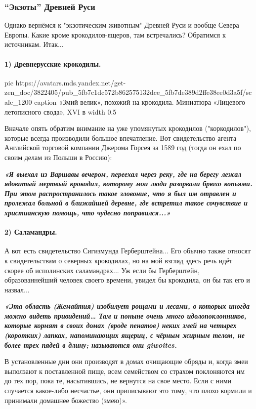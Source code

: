 \subsubsection{\enquote{Экзоты} Древней Руси}

Однако вернёмся к "экзотическим животным" Древней Руси и вообще Севера Европы.
Какие кроме крокодилов-ящеров, там встречались? Обратимся к источникам. Итак...

\paragraph{1) Древнерусские крокодилы.}

\ifcmt
  pic https://avatars.mds.yandex.net/get-zen_doc/3822405/pub_5fb7c1dc572b862575132dce_5fb7de389d2ffe38ee0d3a5f/scale_1200
	caption «Змий велик», похожий на крокодила. Миниатюра «Лицевого летописного свода», XVI в
	width 0.5
\fi

Вначале опять обратим внимание на уже упомянутых крокодилов ("коркодилов"),
которые всегда производили большое впечатление. Вот свидетельство агента
Английской торговой компании Джерома Горсея за 1589 год (тогда он ехал по своим
делам из Польши в Россию): 

\begin{leftbar}
  \begingroup
    \em\large\bfseries\color{blue}
«Я выехал из Варшавы вечером, переехал через реку, где на берегу лежал ядовитый
мертвый крокодил, которому мои люди разорвали брюхо копьями. При этом
распространилось такое зловоние, что я был им отравлен и пролежал больной в
ближайшей деревне, где встретил такое сочувствие и христианскую помощь, что
чудесно поправился...»
  \endgroup
\end{leftbar}

\paragraph{2) Саламандры.}

А вот есть свидетельство Сигизмунда Герберштейна... Его обычно также относят к
свидетельствам о северных крокодилах, но на мой взгляд здесь речь идёт скорее
об исполинских саламандрах... Уж если бы Герберштейн, образованнейший человек
своего времени, увидел бы крокодила, он бы так его и назвал...

\begin{leftbar}
  \begingroup
    \em\large\bfseries\color{blue}
				«Эта область (Жемайтия) изобилует рощами и лесами, в которых иногда
				можно видеть привидений… Там и поныне очень много идолопоклонников,
				которые кормят в своих домах (вроде пенатов) неких змей на четырех
				(коротких) лапках, напоминающих ящериц, с чёрным жирным телом, не более
				трех пядей в длину; называются они giwoites.

		В установленные дни они производят в домах очищающие обряды и, когда змеи
				выползают к поставленной пище, всем семейством со страхом поклоняются
				им до тех пор, пока те, насытившись, не вернутся на свое место. Если с
				ними случается какое-либо несчастье, они приписывают это тому, что
				плохо кормили и принимали домашнее божество (змею)».
  \endgroup
\end{leftbar}

